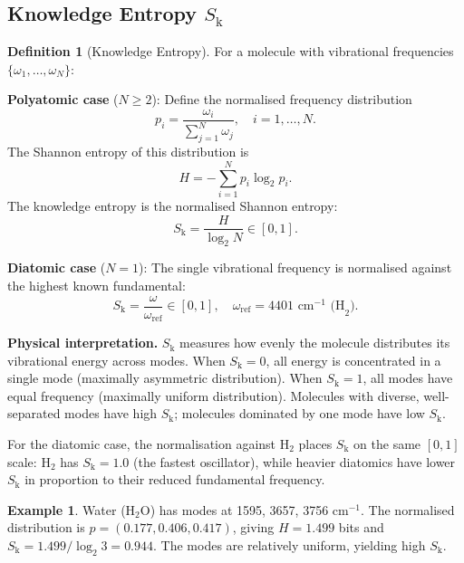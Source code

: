 \documentclass[11pt,twocolumn,a4paper]{article}
\theoremstyle{definition}
\newtheorem{definition}[theorem]{Definition}
\newtheorem{example}[theorem]{Example}
\theoremstyle{remark}
\newcommand{\Sk}{S_{\mathrm{k}}}
\begin{document}
\subsection{Knowledge Entropy \texorpdfstring{$\Sk$}{S\_k}}

\begin{definition}[Knowledge Entropy]
\label{def:s_k}
For a molecule with vibrational frequencies $\{\omega_1, \ldots, \omega_N\}$:

\textbf{Polyatomic case} ($N \geq 2$): Define the normalised frequency distribution
\begin{equation}
p_i = \frac{\omega_i}{\sum_{j=1}^{N} \omega_j}, \quad i = 1, \ldots, N.
\label{eq:frequency_distribution}
\end{equation}
The Shannon entropy \citep{shannon1948} of this distribution is
\begin{equation}
H = -\sum_{i=1}^{N} p_i \log_2 p_i.
\label{eq:shannon}
\end{equation}
The knowledge entropy is the normalised Shannon entropy:
\begin{equation}
\Sk = \frac{H}{\log_2 N} \in [0, 1].
\label{eq:s_k_poly}
\end{equation}

\textbf{Diatomic case} ($N = 1$): The single vibrational frequency is normalised against the highest known fundamental:
\begin{equation}
\Sk = \frac{\omega}{\omega_{\mathrm{ref}}} \in [0, 1], \quad \omega_{\mathrm{ref}} = 4401 \text{ cm}^{-1} \text{ (H}_2\text{)}.
\label{eq:s_k_diatomic}
\end{equation}
\end{definition}

\textbf{Physical interpretation.} $\Sk$ measures how evenly the molecule distributes its vibrational energy across modes. When $\Sk = 0$, all energy is concentrated in a single mode (maximally asymmetric distribution). When $\Sk = 1$, all modes have equal frequency (maximally uniform distribution). Molecules with diverse, well-separated modes have high $\Sk$; molecules dominated by one mode have low $\Sk$.

For the diatomic case, the normalisation against H$_2$ places $\Sk$ on the same $[0,1]$ scale: H$_2$ has $\Sk = 1.0$ (the fastest oscillator), while heavier diatomics have lower $\Sk$ in proportion to their reduced fundamental frequency.

\begin{example}
Water (H$_2$O) has modes at 1595, 3657, 3756 cm$^{-1}$. The normalised distribution is $p = (0.177, 0.406, 0.417)$, giving $H = 1.499$ bits and $\Sk = 1.499/\log_2 3 = 0.944$. The modes are relatively uniform, yielding high $\Sk$.
\end{example}
\end{document}
